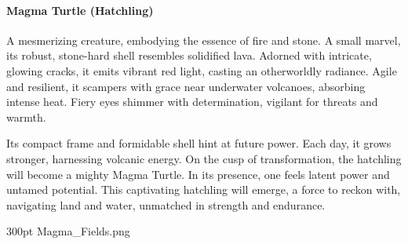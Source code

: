 \paragraph{Magma Turtle (Hatchling)}
A mesmerizing creature, embodying the essence of fire and stone. A small marvel, its robust, stone-hard shell resembles solidified lava. Adorned with intricate, glowing cracks, it emits vibrant red light, casting an otherworldly radiance. Agile and resilient, it scampers with grace near underwater volcanoes, absorbing intense heat. Fiery eyes shimmer with determination, vigilant for threats and warmth.

Its compact frame and formidable shell hint at future power. Each day, it grows stronger, harnessing volcanic energy. On the cusp of transformation, the hatchling will become a mighty Magma Turtle. In its presence, one feels latent power and untamed potential. This captivating \linebreak\hspace*{1cm}hatchling will emerge, a force to reckon with, \linebreak\hspace*{3cm}navigating land and water, unmatched in \linebreak\hspace*{5.5cm}strength and endurance.


\newpage

\MonsterFooterGraphic{50pt}%
	{300pt}%
	{Magma_Fields.png}%
	{}%
%

%
%


